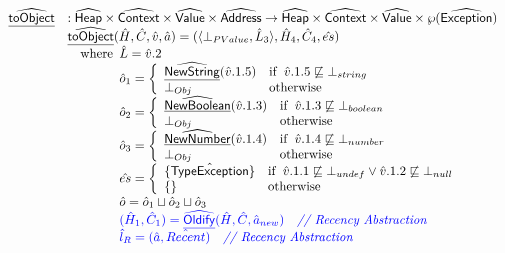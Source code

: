 \[
\begin{array}{ll}

\widehat{\underline{\sf toObject}} & : \widehat{\mbox{\textsf{Heap}}} \times \widehat{\mbox{\textsf{Context}}} \times \widehat{\mbox{\textsf{Value}}} \times \widehat{\mbox{\textsf{Address}}} \rightarrow \widehat{\mbox{\textsf{Heap}}} \times \widehat{\mbox{\textsf{Context}}} \times \widehat{\mbox{\textsf{Value}}} \times \wp(\widehat{\mbox{\textsf{Exception}}}) \\
& \widehat{\underline{\sf toObject}}(\hat{H}, \hat{C}, \hat{v}, \hat{a})
  = (\langle\bot_{PValue},\hat{L}_3\rangle,\hat{H}_4,\hat{C}_4,\hat{es}) \\
  & \quad{\rm where}\begin{array}[t]{l}
    \hat{L} = \hat{v}.2\\
    \hat{o}_1 =
    \left\{
      \begin{array}{ll}
        \widehat{\underline{\sf NewString}}(\hat{v}.1.5) & {\rm if}\begin{array}[t]{l}\hat{v}.1.5\not\sqsubseteq\bot_{string}\end{array} \\
        \bot_{Obj} & {\rm otherwise}\\
      \end{array}
    \right.\\
    \hat{o}_2 =
    \left\{
      \begin{array}{ll}
        \widehat{\underline{\sf NewBoolean}}(\hat{v}.1.3) & {\rm if}\begin{array}[t]{l}\hat{v}.1.3\not\sqsubseteq\bot_{boolean}\end{array} \\
        \bot_{Obj} & {\rm otherwise}\\
      \end{array}
    \right.\\
    \hat{o}_3 =
    \left\{
      \begin{array}{ll}
        \widehat{\underline{\sf NewNumber}}(\hat{v}.1.4) & {\rm if}\begin{array}[t]{l}\hat{v}.1.4\not\sqsubseteq\bot_{number}\end{array} \\
        \bot_{Obj} & {\rm otherwise}\\
      \end{array}
    \right.\\
    \hat{es} = 
    \left\{
      \begin{array}{ll}
        \{\hat{\mbox{\textsf{TypeException}}}\} & {\rm if}\begin{array}[t]{l}\hat{v}.1.1\not\sqsubseteq\bot_{undef}\lor \hat{v}.1.2\not\sqsubseteq\bot_{null}\end{array} \\
        \{\} & {\rm otherwise}\\
      \end{array}
    \right.\\
    \hat{o} = \hat{o}_1 \sqcup \hat{o}_2 \sqcup \hat{o}_3 \\

    \color{blue} (\hat{H}_1, \hat{C}_1) = \widehat{\underline{\sf Oldify}}(\hat{H}, \hat{C}, \hat{a}_{new})
    \quad\textit{{\color{blue}// Recency Abstraction}}\\
    \color{blue}\hat{l}_{R} = (\hat{a}, \hat{Recent})
    \quad\textit{{\color{blue}// Recency Abstraction}}\\

\end{array}
\end{array}\]
